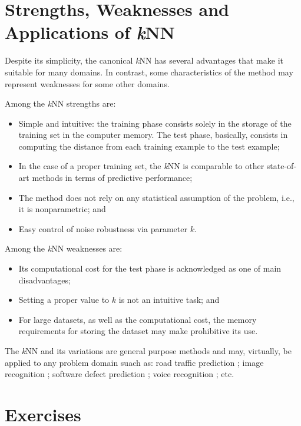 \section{Strengths, Weaknesses and Applications of \textit{k}NN}

Despite its simplicity, the canonical \textit{k}NN has several advantages that make it suitable for many domains. In contrast, some characteristics of the method may represent weaknesses for some other domains. 
\vspace{0.2cm}

\noindent Among the \textit{k}NN strengths are:

\begin{itemize}
    \item Simple and intuitive: the training phase consists solely in the storage of the training set in the computer memory. The test phase, basically, consists in computing the distance from each training example to the test example;
    \item In the case of a proper training set, the \textit{k}NN is comparable to other state-of-art methods in terms of predictive performance;
    \item The method does not rely on any statistical assumption of the problem, i.e., it is nonparametric; and
    \item Easy control of noise robustness via parameter $k$.
\end{itemize}

\noindent Among the \textit{k}NN weaknesses are:


\begin{itemize}
    \item Its computational cost for the test phase is acknowledged as one of main disadvantages;  
    \item Setting a proper value to $k$ is not an intuitive task; and
    \item For large datasets, as well as the computational cost, the memory requirements for storing the dataset may make prohibitive its use. 
    
\end{itemize}

The \textit{k}NN and its variations are general purpose methods and may, virtually, be applied to any problem domain suach as: road traffic prediction \cite{XU2020104}; image recognition \cite{CHEN201878}; software defect prediction \cite{GOYAL201415}; voice recognition \cite{CHEN2021932.e1}; etc.

\section{Exercises}

